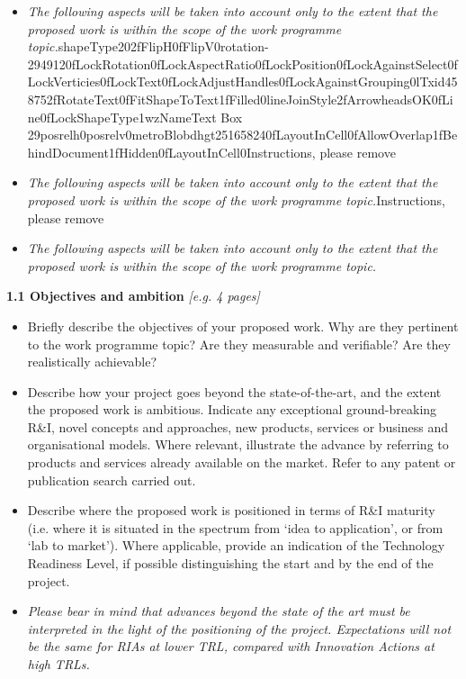 \begin{itemize}
\item
  \emph{The following aspects will be taken into account only to the
  extent that the proposed work is within the scope of the work
  programme
  topic.}shapeType202fFlipH0fFlipV0rotation-2949120fLockRotation0fLockAspectRatio0fLockPosition0fLockAgainstSelect0fLockVerticies0fLockText0fLockAdjustHandles0fLockAgainstGrouping0lTxid458752fRotateText0fFitShapeToText1fFilled0lineJoinStyle2fArrowheadsOK0fLine0fLockShapeType1wzNameText
  Box
  29posrelh0posrelv0metroBlobdhgt251658240fLayoutInCell0fAllowOverlap1fBehindDocument1fHidden0fLayoutInCell0Instructions,
  please remove
\item
  \emph{The following aspects will be taken into account only to the
  extent that the proposed work is within the scope of the work
  programme topic.}Instructions, please remove
\item
  \emph{The following aspects will be taken into account only to the
  extent that the proposed work is within the scope of the work
  programme topic.}
\end{itemize}

\textbf{1.1 Objectives and ambition }\emph{{[}e.g. 4 pages{]}}

\begin{itemize}
\item
  Briefly describe the objectives of your proposed work. Why are they
  pertinent to the work programme topic? Are they measurable and
  verifiable? Are they realistically achievable?
\item
  Describe how your project goes beyond the state-of-the-art, and the
  extent the proposed work is ambitious. Indicate any exceptional
  ground-breaking R\&I, novel concepts and approaches, new products,
  services or business and organisational models. Where relevant,
  illustrate the advance by referring to products and services already
  available on the market. Refer to any patent or publication search
  carried out.
\item
  Describe where the proposed work is positioned in terms of R\&I
  maturity (i.e. where it is situated in the spectrum from `idea to
  application', or from `lab to market'). Where applicable, provide an
  indication of the Technology Readiness Level, if possible
  distinguishing the start and by the end of the project.
\end{itemize}

\begin{itemize}
\item
  \emph{Please bear in mind that advances beyond the state of the art
  must be interpreted in the light of the positioning of the project.
  Expectations will not be the same for RIAs at lower TRL, compared with
  Innovation Actions at high TRLs. }
\end{itemize}

